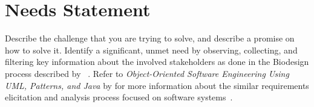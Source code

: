 \section*{Needs Statement}

\begin{tcolorbox}[breakable]
	Describe the challenge that you are trying to solve, and describe a promise on how to solve it.
	Identify a significant, unmet need by observing, collecting, and filtering key information about the involved stakeholders as done in the Biodesign process described by \citeauthor{yock2015biodesign}~\cite{yock2015biodesign}.
	Refer to \textit{Object-Oriented Software Engineering Using UML, Patterns, and Java} by \citeauthor{bruegge2013object} for more information about the similar requirements elicitation and analysis process focused on software systems~\cite{bruegge2013object}.

\end{tcolorbox}
